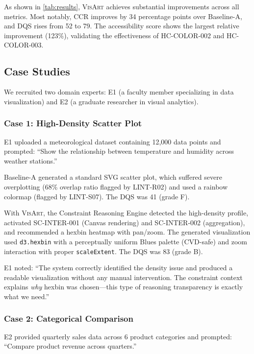 \documentclass[final,5p,times,twocolumn]{elsarticle}
\newcommand{\sysname}{\textsc{VisArt}}
\begin{document}
As shown in \cref{tab:results}, \sysname{} achieves substantial improvements across all metrics.
Most notably, CCR improves by 34 percentage points over Baseline-A, and DQS rises from 52 to 79.
The accessibility score shows the largest relative improvement (123\%), validating the effectiveness of HC-COLOR-002 and HC-COLOR-003.

\subsection{Case Studies}

We recruited two domain experts: E1 (a faculty member specializing in data visualization) and E2 (a graduate researcher in visual analytics).

\subsubsection{Case 1: High-Density Scatter Plot}

E1 uploaded a meteorological dataset containing 12,000 data points and prompted: ``Show the relationship between temperature and humidity across weather stations.''

Baseline-A generated a standard SVG scatter plot, which suffered severe overplotting (68\% overlap ratio flagged by LINT-R02) and used a rainbow colormap (flagged by LINT-S07).
The DQS was 41 (grade F).

With \sysname{}, the Constraint Reasoning Engine detected the high-density profile, activated SC-INTER-001 (Canvas rendering) and SC-INTER-002 (aggregation), and recommended a hexbin heatmap with pan/zoom.
The generated visualization used \texttt{d3.hexbin} with a perceptually uniform Blues palette (CVD-safe) and zoom interaction with proper \texttt{scaleExtent}.
The DQS was 83 (grade B).

E1 noted: ``The system correctly identified the density issue and produced a readable visualization without any manual intervention.
The constraint context explains \textit{why} hexbin was chosen---this type of reasoning transparency is exactly what we need.''

\subsubsection{Case 2: Categorical Comparison}

E2 provided quarterly sales data across 6 product categories and prompted: ``Compare product revenue across quarters.''
\end{document}
